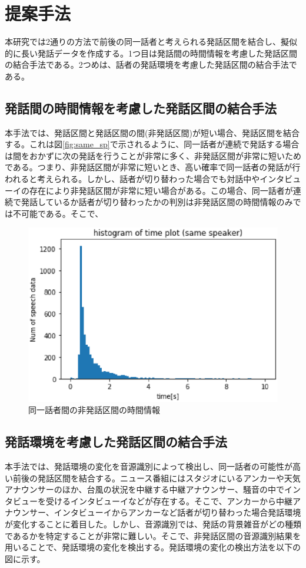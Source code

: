 \chapter{提案手法}
\label{chapter:prob_method}
本研究では2通りの方法で前後の同一話者と考えられる発話区間を結合し、擬似的に長い発話データを作成する。1つ目は発話間の時間情報を考慮した発話区間の結合手法である。2つめは、話者の発話環境を考慮した発話区間の結合手法である。

\section{発話間の時間情報を考慮した発話区間の結合手法}
本手法では、発話区間と発話区間の間(非発話区間)が短い場合、発話区間を結合する。これは図\ref{fig:same_sp}で示されるように、同一話者が連続で発話する場合は間をおかずに次の発話を行うことが非常に多く、非発話区間が非常に短いためである。つまり、非発話区間が非常に短いとき、高い確率で同一話者の発話が行われると考えられる。しかし、話者が切り替わった場合でも対話中やインタビューイの存在により非発話区間が非常に短い場合がある。この場合、同一話者が連続で発話しているか話者が切り替わったかの判別は非発話区間の時間情報のみでは不可能である。そこで、

\begin{figure}[htb]
  \begin{center}
    \includegraphics{./figure/same_sp.eps}
  \end{center}
  \caption{同一話者間の非発話区間の時間情報 \label{fig:flow_prob1}}
\end{figure}

\section{発話環境を考慮した発話区間の結合手法}
本手法では、発話環境の変化を音源識別によって検出し、同一話者の可能性が高い前後の発話区間を結合する。ニュース番組にはスタジオにいるアンカーや天気アナウンサーのほか、台風の状況を中継する中継アナウンサー、騒音の中でインタビューを受けるインタビューイなどが存在する。そこで、アンカーから中継アナウンサー、インタビューイからアンカーなど話者が切り替わった場合発話環境が変化することに着目した。しかし、音源識別では、発話の背景雑音がどの種類であるかを特定することが非常に難しい。そこで、非発話区間の音源識別結果を用いることで、発話環境の変化を検出する。発話環境の変化の検出方法を以下の図に示す。\par

